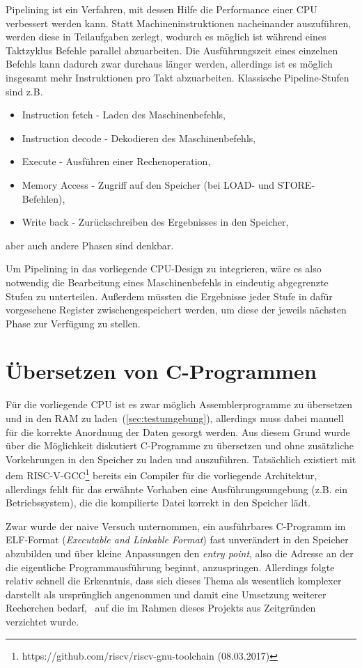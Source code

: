 Pipelining ist ein Verfahren, mit dessen Hilfe die Performance einer CPU verbessert werden kann.
Statt Machineninstruktionen nacheinander auszuführen, werden diese in Teilaufgaben zerlegt, wodurch es möglich ist während eines Taktzyklus Befehle parallel abzuarbeiten.
Die Ausführungszeit eines einzelnen Befehls kann dadurch zwar durchaus länger werden, allerdings ist es möglich insgesamt mehr Instruktionen pro Takt abzuarbeiten.
Klassische Pipeline-Stufen sind z.B.
\begin{itemize}
    \item Instruction fetch - Laden des Maschinenbefehls,
    \item Instruction decode - Dekodieren des Maschinenbefehls,
    \item Execute - Ausführen einer Rechenoperation,
    \item Memory Access - Zugriff auf den Speicher (bei LOAD- und STORE-Befehlen),
    \item Write back - Zurückschreiben des Ergebnisses in den Speicher,
\end{itemize}
aber auch andere Phasen sind denkbar.

Um Pipelining in das vorliegende CPU-Design zu integrieren, wäre es also notwendig die Bearbeitung eines Maschinenbefehls in eindeutig abgegrenzte Stufen zu unterteilen. 
Außerdem müssten die Ergebnisse jeder Stufe in dafür vorgesehene Register zwischengespeichert werden, um diese der jeweils nächsten Phase zur Verfügung zu stellen.

\section{Übersetzen von C-Programmen}
Für die vorliegende CPU ist es zwar möglich Assemblerprogramme zu übersetzen und in den RAM zu laden~(\ref{sec:testumgebung}), allerdings muss dabei manuell für die korrekte Anordnung der Daten gesorgt werden.
Aus diesem Grund wurde über die Möglichkeit diskutiert C-Programme zu übersetzen und ohne zusätzliche Vorkehrungen in den Speicher zu laden und auszuführen.
Tatsächlich existiert mit dem RISC-V-GCC\footnote{https://github.com/riscv/riscv-gnu-toolchain (08.03.2017)} bereits ein Compiler für die vorliegende Architektur, allerdings fehlt für das erwähnte Vorhaben eine Ausführungsumgebung (z.B. ein Betriebssystem), die die kompilierte Datei korrekt in den Speicher lädt.

Zwar wurde der naive Versuch unternommen, ein ausführbares C-Programm im ELF-Format (\textit{Executable and Linkable Format}) fast unverändert in den Speicher abzubilden und über kleine Anpassungen den \textit{entry point}, also die Adresse an der die eigentliche Programmausführung beginnt, anzuspringen.
Allerdings folgte relativ schnell die Erkenntnis, dass sich dieses Thema als wesentlich komplexer darstellt als ursprünglich angenommen und damit eine Umsetzung weiterer Recherchen bedarf,~\cite[S. 9 ff.]{elf} auf die im Rahmen dieses Projekts aus Zeitgründen verzichtet wurde.




